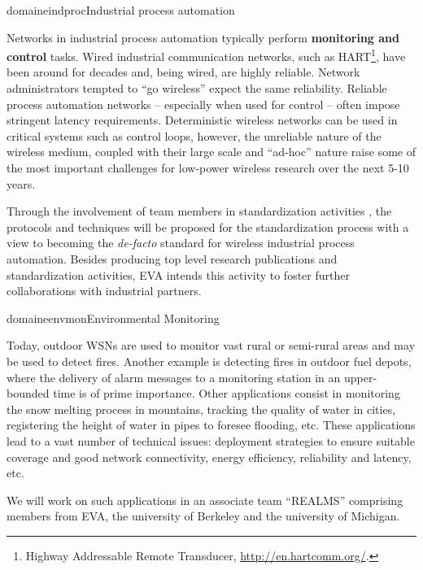 \documentclass{ra2016}
\newcommand{\thomas}  {\textbf{Thomas~Watteyne}}
\begin{document}
\begin{module}{domaine}{indproc}{Industrial process automation}

Networks in industrial process automation typically perform \textbf{monitoring and control} tasks. Wired industrial communication networks, such as HART\footnote{Highway Addressable Remote Transducer, \url{http://en.hartcomm.org/}.}, have been around for decades and, being wired, are highly reliable. Network administrators tempted to ``go wireless'' expect the same reliability. Reliable process automation networks -- especially when used for control -- often impose stringent latency requirements.  Deterministic wireless networks can be used in critical systems such as control loops, however, the unreliable nature of the wireless medium, coupled with their large scale and ``ad-hoc'' nature raise some of the most important challenges for low-power wireless research over the next 5-10 years.

Through the involvement of team members in standardization activities%
, the protocols and techniques will be proposed for the standardization process with a view to becoming the \textit{de-facto} standard for wireless industrial process automation. Besides producing top level research publications and standardization activities, EVA intends this activity to foster further collaborations with industrial partners.

\end{module}

\begin{module}{domaine}{envmon}{Environmental Monitoring}

Today, outdoor WSNs are used to monitor vast rural or semi-rural areas and may be used to detect fires. Another example is detecting fires in outdoor fuel depots, where the delivery of alarm messages to a monitoring station in an upper-bounded time is of prime importance. Other applications consist in monitoring the snow melting process in mountains, tracking the quality of water in cities, registering the height of water in pipes to foresee flooding, etc. These applications lead to a vast number of technical issues: deployment strategies to ensure suitable coverage and good network connectivity, energy efficiency, reliability and latency, etc.

We will work on such applications in an associate team ``REALMS'' comprising members from EVA, the university of Berkeley and the university of Michigan. 

\end{module}
\end{document}
